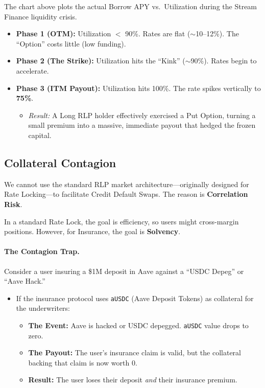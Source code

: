 \documentclass[12pt]{article}
\begin{document}
The chart above plots the actual Borrow APY vs.\ Utilization during the Stream Finance liquidity crisis.

\begin{itemize}
    \item \textbf{Phase 1 (OTM):} Utilization $<$ 90\%. Rates are flat ($\sim$10--12\%). The ``Option'' costs little (low funding).
    \item \textbf{Phase 2 (The Strike):} Utilization hits the ``Kink'' ($\sim$90\%). Rates begin to accelerate.
    \item \textbf{Phase 3 (ITM Payout):} Utilization hits 100\%. The rate spikes vertically to \textbf{75\%}.
    \begin{itemize}
        \item \emph{Result:} A Long RLP holder effectively exercised a Put Option, turning a small premium into a massive, immediate payout that hedged the frozen capital.
    \end{itemize}
\end{itemize}

\subsection{Collateral Contagion}

We cannot use the standard RLP market architecture---originally designed for Rate Locking---to facilitate Credit Default Swaps. The reason is \textbf{Correlation Risk}.

In a standard Rate Lock, the goal is efficiency, so users might cross-margin positions. However, for Insurance, the goal is \textbf{Solvency}.

\paragraph{The Contagion Trap.}
Consider a user insuring a \$1M deposit in Aave against a ``USDC Depeg'' or ``Aave Hack.''

\begin{itemize}
    \item If the insurance protocol uses \texttt{aUSDC} (Aave Deposit Tokens) as collateral for the underwriters:
    \begin{itemize}
        \item \textbf{The Event:} Aave is hacked or USDC depegged. \texttt{aUSDC} value drops to zero.
        \item \textbf{The Payout:} The user's insurance claim is valid, but the collateral backing that claim is now worth 0.
        \item \textbf{Result:} The user loses their deposit \emph{and} their insurance premium.
    \end{itemize}
\end{itemize}
\end{document}

